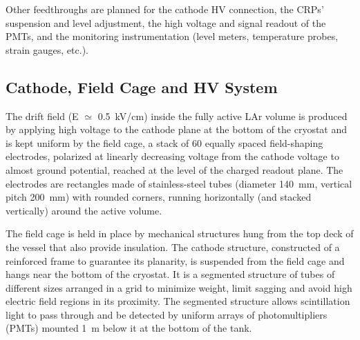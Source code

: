 Other feedthroughs are planned for the cathode HV connection, the
CRPs' suspension and level adjustment, the high voltage and signal
readout of the PMTs, and the monitoring instrumentation (level meters,
temperature probes, strain gauges, etc.).

\subsection{Cathode, Field Cage and HV System}
\label{v4:fd-alt-ov:cathode}

The drift field (E ${\simeq}$ 0.5~kV/cm) inside the fully
active LAr volume is produced by applying high voltage to the cathode
plane at the bottom of the cryostat and is kept uniform by the field cage, a stack
of 60 equally spaced field-shaping electrodes,  
polarized at linearly decreasing voltage from the cathode 
voltage to almost ground potential, reached at the level of the charged readout plane.
The electrodes are rectangles made of stainless-steel tubes  (diameter 140~mm,  vertical pitch 200~mm)
with rounded corners, running horizontally (and stacked vertically) around the
active volume.


The field cage is held in place by mechanical structures hung from the
top deck of the vessel that also provide insulation.  The cathode
structure, constructed of a reinforced frame to 
guarantee its planarity, is suspended from the field cage and hangs near the 
bottom of the cryostat. It is a segmented structure of tubes of different sizes 
arranged in a grid to minimize weight, limit sagging and avoid high electric field
regions in its proximity.  The segmented structure allows scintillation light to pass
through and be detected by uniform arrays of photomultipliers (PMTs) mounted
1~m below it at the bottom of the tank.